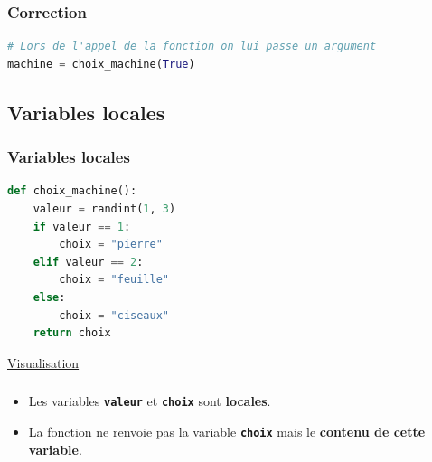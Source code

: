 \documentclass[svgnames,11pt]{beamer}
\begin{document}
\begin{frame}[fragile]
    \frametitle{Correction}

\begin{center}
\begin{lstlisting}[language=Python , basicstyle=\ttfamily\small, xleftmargin=2em, xrightmargin=2em]
# Lors de l'appel de la fonction on lui passe un argument
machine = choix_machine(True)
\end{lstlisting}
\label{CODE}
\end{center}
\end{frame}
\subsection{Variables locales}
\begin{frame}[fragile]
    \frametitle{Variables locales}

\begin{center}
\begin{lstlisting}[language=Python , basicstyle=\ttfamily\small, xleftmargin=2em, xrightmargin=2em]
def choix_machine():
    valeur = randint(1, 3)
    if valeur == 1:
        choix = "pierre"
    elif valeur == 2:
        choix = "feuille"
    else:
        choix = "ciseaux"
    return choix
\end{lstlisting}
{\Large \href{https://pythontutor.com/visualize.html#code=from%20random%20import%20randint%0A%0Adef%20choix_machine%28%29%3A%0A%20%20%20%20valeur%20%3D%20randint%281,%203%29%0A%20%20%20%20if%20valeur%20%3D%3D%201%3A%0A%20%20%20%20%20%20%20%20choix%20%3D%20%22pierre%22%0A%20%20%20%20elif%20valeur%20%3D%3D%202%3A%0A%20%20%20%20%20%20%20%20choix%20%3D%20%22feuille%22%0A%20%20%20%20else%3A%0A%20%20%20%20%20%20%20%20choix%20%3D%20%22ciseaux%22%0A%20%20%20%20return%20choix%0A%0Amachine%20%3D%20choix_machine%28%29&cumulative=false&curInstr=0&heapPrimitives=nevernest&mode=display&origin=opt-frontend.js&py=3&rawInputLstJSON=%5B%5D&textReferences=false}{Visualisation}}
\end{center}

\end{frame}
\begin{frame}
    \frametitle{}

    \begin{itemize}
        \item<1-> Les variables \textbf{\texttt{valeur}} et \textbf{\texttt{choix}} sont \textbf{locales}.
        \item<2-> La fonction ne renvoie pas la variable \textbf{\texttt{choix}} mais le \textbf{contenu de cette variable}.
    \end{itemize}

\end{frame}
\end{document}
